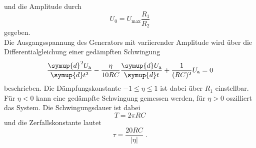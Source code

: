 und die Amplitude durch 
\begin{equation}
    U_0 = U_\text{max} \frac{R_1}{R_2}
    \label{eq:amplitude_generator}
\end{equation}
gegeben. \\
Die Ausgangsspannung des Generators mit variierender Amplitude wird über die Differentialgleichung einer gedämpften Schwingung
\begin{equation}
    \frac{\symup{d}^2 U_\text{a}}{\symup{d}t^2} - \frac{\eta}{10RC}\frac{\symup{d}U_\text{a}}{\symup{d}t} + \frac{1}{(RC)^2}U_\text{a} = 0
\end{equation}
beschrieben. Die Dämpfungskonstante $-1 \leq \eta \leq 1$ ist dabei über $R_1$ einstellbar. 
Für $\eta < 0$ kann eine gedämpfte Schwingung gemessen werden, für $\eta > 0$ oszilliert das System.
Die Schwingungsdauer ist dabei 
\begin{equation}
    T = 2 \pi RC 
    \label{eq:T}
\end{equation}
und die Zerfallskonstante lautet
\begin{equation}
    \tau = \frac{20 RC}{|\eta|} \; .
\end{equation}

